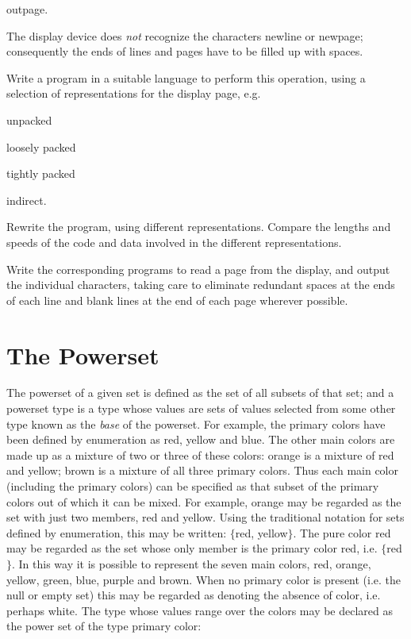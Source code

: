 \documentclass[twoside,11pt]{book}
\begin{document}
\quad outpage.

\noindent
The display device does \textit{not} recognize the characters newline or newpage; consequently the ends of lines and pages have to be filled up with spaces.

Write a program in a suitable language to perform this operation, using a selection of representations for the display page, e.g.

\quad unpacked

\quad loosely packed

\quad tightly packed

\quad indirect.

\noindent
Rewrite the program, using different representations. Compare the lengths and speeds of the code and data involved in the different representations.

Write the corresponding programs to read a page from the display, and output the individual characters, taking care to eliminate redundant spaces at the ends of each line and blank lines at the end of each page wherever possible.

\section[The powerset]{The Powerset}

The powerset of a given set is defined as the set of all subsets of that set; and a powerset type is a type whose values are sets of values selected from some other type known as the \textit{base} of the powerset. For example, the primary colors have been defined by enumeration as red, yellow and blue. The other main colors are made up as a mixture of two or three of these colors: orange is a mixture of red and yellow; brown is a mixture of all three primary colors. Thus each main color (including the primary colors) can be specified as that subset of the primary colors out of which it can be mixed. For example, orange may be regarded as the set with just two members, red and yellow. Using the traditional notation for sets defined by enumeration, this may be written: $\{$red, yellow$\}$. The pure color red may be regarded as the set whose only member is the primary color red, i.e. $\{$red$\}$. In this way it is possible to represent the seven main colors, red, orange, yellow, green, blue, purple and brown. When no primary color is present (i.e. the null or empty set) this may be regarded as denoting the absence of color, i.e. perhaps white. The type whose values range over the colors may be declared as the power set of the type primary color:
\end{document}
